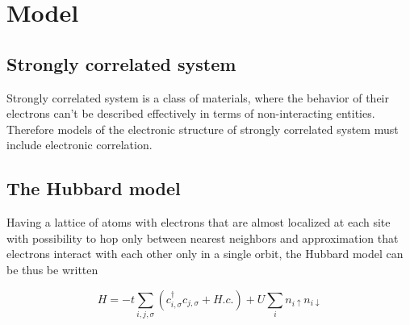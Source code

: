\section{Model}
\subsection{Strongly correlated system}
Strongly correlated system is a class of materials, where the behavior of their electrons can't be 
described effectively in terms of non-interacting entities. Therefore models of the electronic
structure of strongly correlated system must include electronic correlation.

\subsection{The Hubbard model}
Having a lattice of atoms with electrons that are almost localized at each site with possibility to hop
only between nearest neighbors and approximation that electrons interact with each other only in a single orbit, 
the Hubbard model can be thus be written

\[ H = -t\sum_{i,j,\sigma}\left(c_{i,\sigma}^\dagger c_{j,\sigma} + H.c.  \right) + U\sum_i n_{i\uparrow}n_{i\downarrow}\]
